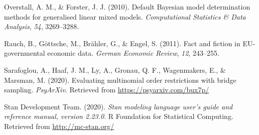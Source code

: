 \documentclass[
  english,
  man,floatsintext]{apa6}
\newlength{\cslhangindent}
\newenvironment{cslreferences}%
  {\setlength{\parindent}{0pt}%
  \everypar{\setlength{\hangindent}{\cslhangindent}}\ignorespaces}%
  {\par}
\begin{document}
\begin{cslreferences}
\leavevmode\hypertarget{ref-overstall2010default}{}%
Overstall, A. M., \& Forster, J. J. (2010). Default Bayesian model determination methods for generalised linear mixed models. \emph{Computational Statistics \& Data Analysis}, \emph{54}, 3269--3288.

\leavevmode\hypertarget{ref-rauch2011fact}{}%
Rauch, B., Göttsche, M., Brähler, G., \& Engel, S. (2011). Fact and fiction in EU-governmental economic data. \emph{German Economic Review}, \emph{12}, 243--255.

\leavevmode\hypertarget{ref-sarafoglou2020evaluatingPreprint}{}%
Sarafoglou, A., Haaf, J. M., Ly, A., Gronau, Q. F., Wagenmakers, E., \& Marsman, M. (2020). Evaluating multinomial order restrictions with bridge sampling. \emph{PsyArXiv}. Retrieved from \url{https://psyarxiv.com/bux7p/}

\leavevmode\hypertarget{ref-stan2020}{}%
Stan Development Team. (2020). \emph{Stan modeling language user's guide and reference manual, version 2.23.0}. R Foundation for Statistical Computing. Retrieved from \url{http://mc-stan.org/}
\end{cslreferences}

\endgroup


\clearpage
\makeatletter
\efloat@restorefloats
\makeatother
\end{document}
